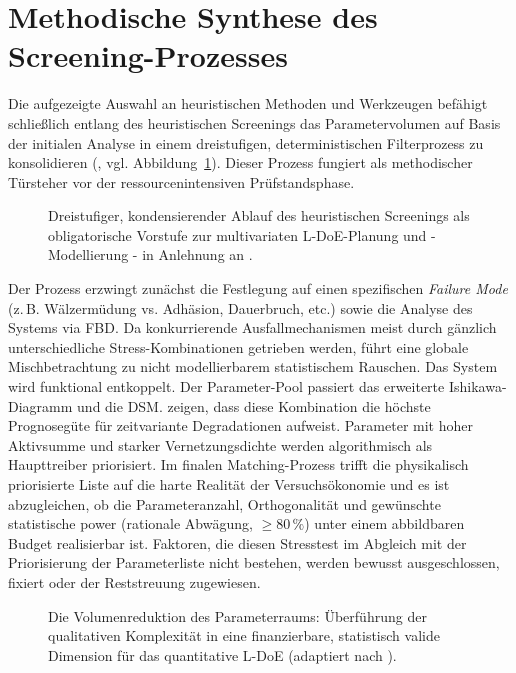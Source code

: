\section{Methodische Synthese des Screening-Prozesses} \label{sec:screening_vorgehen}
Die aufgezeigte Auswahl an heuristischen Methoden und Werkzeugen befähigt schließlich entlang des heuristischen Screenings das Parametervolumen auf Basis der initialen Analyse in einem dreistufigen, deterministischen Filterprozess zu konsolidieren (\textcite{Arndt.2023c}, vgl. Abbildung~\ref{fig:screening_procedure}).
Dieser Prozess fungiert als methodischer Türsteher vor der ressourcenintensiven Prüfstandsphase.
\begin{figure}[htbp]
    \centering
    \def\svgwidth{0.5\textwidth}
    
    \caption{Dreistufiger, kondensierender Ablauf des heuristischen Screenings als obligatorische Vorstufe zur multivariaten \ac{L-DoE}-Planung und -Modellierung - in Anlehnung an \cite{Arndt.2023c}.}
    \label{fig:screening_procedure}
\end{figure}
Der Prozess erzwingt zunächst die Festlegung auf einen spezifischen \textit{Failure Mode} (z.\,B. Wälzermüdung vs. Adhäsion, Dauerbruch, etc.) sowie die Analyse des Systems via \ac{FBD}.
Da konkurrierende Ausfallmechanismen meist durch gänzlich unterschiedliche Stress-Kombinationen getrieben werden, führt eine globale Mischbetrachtung zu nicht modellierbarem statistischem Rauschen.
Das System wird funktional entkoppelt.
Der Parameter-Pool passiert das erweiterte Ishikawa-Diagramm und die \ac{DSM}. \textcite{Arndt.2023c} zeigen, dass diese Kombination die höchste Prognosegüte für zeitvariante Degradationen aufweist.
Parameter mit hoher Aktivsumme und starker Vernetzungsdichte werden algorithmisch als Haupttreiber priorisiert.
Im finalen Matching-Prozess trifft die physikalisch priorisierte Liste auf die harte Realität der Versuchsökonomie und es ist abzugleichen, ob die Parameteranzahl, Orthogonalität und gewünschte statistische \ac{power} (rationale Abwägung, $\ge 80\,\%$) unter einem abbildbaren Budget realisierbar ist.
Faktoren, die diesen Stresstest im Abgleich mit der Priorisierung der Parameterliste nicht bestehen, werden bewusst ausgeschlossen, fixiert oder der Reststreuung zugewiesen.
\begin{figure}[htbp]
    \centering
    \def\svgwidth{0.8\textwidth}
    
    \caption{Die Volumenreduktion des Parameterraums: Überführung der qualitativen Komplexität in eine finanzierbare, statistisch valide Dimension für das quantitative \ac{L-DoE} (adaptiert nach \cite{Arndt.2023c}).}
    \label{fig:screening_procedure_volume}
\end{figure}
